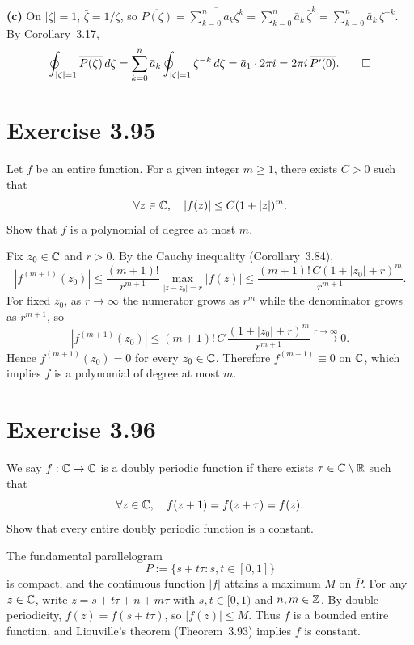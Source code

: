 \documentclass{article}
\begin{document}
\begin{solution}
  \medskip

  \textbf{(c)}\;
  On $|\zeta|=1$, $\bar\zeta = 1/\zeta$, so
  $\overline{P(\zeta)} = \overline{\sum_{k=0}^{n}a_k\zeta^k}
  = \sum_{k=0}^{n}\bar{a}_k\,\bar\zeta^k
  = \sum_{k=0}^{n}\bar{a}_k\,\zeta^{-k}$.
  By Corollary~3.17,
  \[
    \oint_{|\zeta|=1}\overline{P(\zeta)}\,d\zeta
    = \sum_{k=0}^{n}\bar{a}_k\oint_{|\zeta|=1}\zeta^{-k}\,d\zeta
    = \bar{a}_1\cdot 2\pi i
    = 2\pi i\,\overline{P'(0)}.\qedhere
  \]
\end{solution}

\section{Exercise 3.95}

Let $f$ be an entire function. For a given integer $m \ge 1$,
there exists $C > 0$ such that
\[
  \forall z \in \mathbb{C},\quad |f(z)| \le C(1 + |z|)^m.
\]
Show that $f$ is a polynomial of degree at most $m$.

\begin{solution}
  Fix $z_0 \in \mathbb{C}$ and $r > 0$.
  By the Cauchy inequality (Corollary~3.84),
  \[
    |f^{(m+1)}(z_0)|
    \le \frac{(m+1)!}{r^{m+1}}\max_{|z-z_0|=r}|f(z)|
    \le \frac{(m+1)!\,C(1+|z_0|+r)^m}{r^{m+1}}.
  \]
  For fixed $z_0$, as $r \to \infty$ the numerator grows as
  $r^m$ while the denominator grows as $r^{m+1}$, so
  \[
    |f^{(m+1)}(z_0)|
    \le (m+1)!\,C\,\frac{(1+|z_0|+r)^m}{r^{m+1}}
    \xrightarrow{r\to\infty}0.
  \]
  Hence $f^{(m+1)}(z_0) = 0$ for every $z_0 \in \mathbb{C}$.
  Therefore $f^{(m+1)} \equiv 0$ on $\mathbb{C}$, which implies
  $f$ is a polynomial of degree at most $m$.\qedhere
\end{solution}

\section{Exercise 3.96}

We say $f : \mathbb{C} \to \mathbb{C}$ is a doubly periodic function if there
exists $\tau \in \mathbb{C} \setminus \mathbb{R}$ such that
\[
  \forall z \in \mathbb{C},\quad f(z + 1) = f(z + \tau) = f(z).
\]
Show that every entire doubly periodic function is a constant.

\begin{solution}
  The fundamental parallelogram
  \[
    P := \{s + t\tau : s,t \in [0,1]\}
  \]
  is compact, and the continuous function $|f|$ attains a maximum
  $M$ on $\bar{P}$.
  For any $z \in \mathbb{C}$, write $z = s + t\tau + n + m\tau$ with
  $s,t \in [0,1)$ and $n,m \in \mathbb{Z}$.
  By double periodicity,
  $f(z) = f(s + t\tau)$, so $|f(z)| \le M$.
  Thus $f$ is a bounded entire function, and Liouville's theorem
  (Theorem~3.93) implies $f$ is constant.\qedhere
\end{solution}
\end{document}
